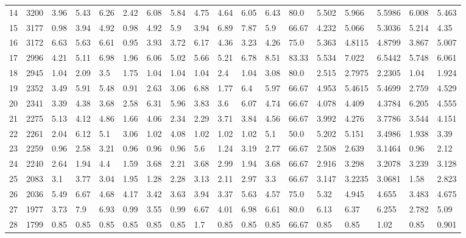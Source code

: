 \documentclass[landscape, 10pt]{report}
\begin{document}
\begin{longtable}{l || l || l | l | l | l | l | l | l | l | l | l | l || l | l | l | l | l}
14 & 3200 & 3.96 & 5.43 & 6.26 & 2.42 & 6.08 & 5.84 & 4.75 & 4.64 & 6.05 & 6.43 & 80.0 & 5.502 & 5.966 & 5.5986 & 6.008 & 5.463\\ 
\rowcolor{lightgray}15 & 3177 & 0.98 & 3.94 & 4.92 & 0.98 & 4.92 & 5.9 & 3.94 & 6.89 & 7.87 & 5.9 & 66.67 & 4.232 & 5.066 & 5.3036 & 5.214 & 4.35\\ 
16 & 3172 & 6.63 & 5.63 & 6.61 & 0.95 & 3.93 & 3.72 & 6.17 & 4.36 & 3.23 & 4.26 & 75.0 & 5.363 & 4.8115 & 4.8799 & 3.867 & 5.007\\ 
\rowcolor{lightgray}17 & 2996 & 4.21 & 5.11 & 6.98 & 1.96 & 6.06 & 5.02 & 5.66 & 5.21 & 6.78 & 8.51 & 83.33 & 5.534 & 7.022 & 6.5442 & 5.748 & 6.061\\ 
18 & 2945 & 1.04 & 2.09 & 3.5 & 1.75 & 1.04 & 1.04 & 1.04 & 2.4 & 1.04 & 3.08 & 80.0 & 2.515 & 2.7975 & 2.2305 & 1.04 & 1.924\\ 
\rowcolor{lightgray}19 & 2352 & 3.49 & 5.91 & 5.48 & 0.91 & 2.63 & 3.06 & 6.88 & 1.77 & 6.4 & 5.97 & 66.67 & 4.953 & 5.4615 & 5.4699 & 2.759 & 4.529\\ 
20 & 2341 & 3.39 & 4.38 & 3.68 & 2.58 & 6.31 & 5.96 & 3.83 & 3.6 & 6.07 & 4.74 & 66.67 & 4.078 & 4.409 & 4.3784 & 6.205 & 4.555\\ 
\rowcolor{lightgray}21 & 2275 & 5.13 & 4.12 & 4.86 & 1.66 & 4.06 & 2.34 & 2.29 & 3.71 & 3.84 & 4.56 & 66.67 & 3.992 & 4.276 & 3.7786 & 3.544 & 4.151\\ 
22 & 2261 & 2.04 & 6.12 & 5.1 & 3.06 & 1.02 & 4.08 & 1.02 & 1.02 & 1.02 & 5.1 & 50.0 & 5.202 & 5.151 & 3.4986 & 1.938 & 3.39\\ 
\rowcolor{lightgray}23 & 2259 & 0.96 & 2.58 & 3.21 & 0.96 & 0.96 & 0.96 & 5.6 & 1.24 & 3.19 & 2.77 & 66.67 & 2.508 & 2.639 & 3.1464 & 0.96 & 2.12\\ 
24 & 2240 & 2.64 & 1.94 & 4.4 & 1.59 & 3.68 & 2.21 & 3.68 & 2.99 & 1.94 & 3.68 & 66.67 & 2.916 & 3.298 & 3.2078 & 3.239 & 3.128\\ 
\rowcolor{lightgray}25 & 2083 & 3.1 & 3.77 & 3.04 & 1.95 & 1.28 & 2.28 & 3.13 & 2.11 & 2.97 & 3.3 & 66.67 & 3.147 & 3.2235 & 3.0681 & 1.58 & 2.823\\ 
26 & 2036 & 5.49 & 6.67 & 4.68 & 4.17 & 3.42 & 3.63 & 3.94 & 3.37 & 5.63 & 4.57 & 75.0 & 5.32 & 4.945 & 4.655 & 3.483 & 4.675\\ 
\rowcolor{lightgray}27 & 1977 & 3.73 & 7.9 & 6.93 & 0.99 & 3.55 & 0.99 & 6.67 & 4.01 & 6.98 & 6.61 & 80.0 & 6.13 & 6.37 & 6.255 & 2.782 & 5.09\\ 
28 & 1799 & 0.85 & 0.85 & 0.85 & 0.85 & 0.85 & 0.85 & 1.7 & 0.85 & 0.85 & 0.85 & 66.67 & 0.85 & 0.85 & 1.02 & 0.85 & 0.901\\ 

\end{longtable}
\end{document}

